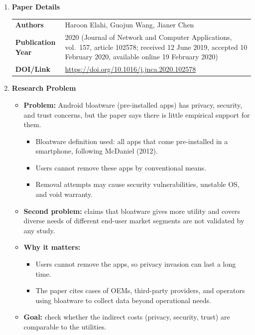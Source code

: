 \documentclass[11pt,a4paper]{article}
\newcommand{\entrypart}[1]{\textbf{\color{accent}#1}\par\vspace{2pt}}
\begin{document}
\begin{enumerate}

    \item \entrypart{Paper Details}

    \begin{tabular}{@{}>{\bfseries}p{3.2cm} p{11.5cm}@{}}
        Authors          & Haroon Elahi, Guojun Wang, Jianer Chen \\[2pt]
        Publication Year & 2020 (Journal of Network and Computer Applications, vol.\ 157, article 102578; received 12 June 2019, accepted 10 February 2020, available online 19 February 2020) \\[2pt]
        DOI/Link         & \url{https://doi.org/10.1016/j.jnca.2020.102578}
    \end{tabular}

    \item \entrypart{Research Problem}
    \begin{itemize}[leftmargin=*, itemsep=1pt, topsep=2pt]
        \item \textbf{Problem:} Android bloatware (pre-installed apps) has privacy, security, and trust concerns, but the paper says there is little empirical support for them.
        \begin{itemize}[itemsep=0pt]
            \item Bloatware definition used: all apps that come pre-installed in a smartphone, following McDaniel (2012).
            \item Users cannot remove these apps by conventional means.
            \item Removal attempts may cause security vulnerabilities, unstable OS, and void warranty.
        \end{itemize}
        \item \textbf{Second problem:} claims that bloatware gives more utility and covers diverse needs of different end-user market segments are not validated by any study.
        \item \textbf{Why it matters:}
        \begin{itemize}[itemsep=0pt]
            \item Users cannot remove the apps, so privacy invasion can last a long time.
            \item The paper cites cases of OEMs, third-party providers, and operators using bloatware to collect data beyond operational needs.
        \end{itemize}
        \item \textbf{Goal:} check whether the indirect costs (privacy, security, trust) are comparable to the utilities.

\end{itemize}
\end{enumerate}
\end{document}
